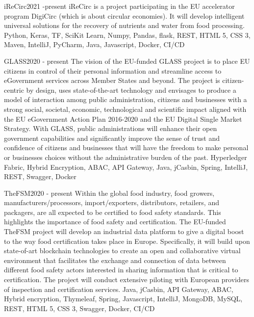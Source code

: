 \begin{projects}
	\project
	{iReCirc}{2021  -present}
	{}
	{iReCirc is a project participating in the EU accelerator program DigiCirc (which is about circular economies). It will develop intelligent universal solutions for the recovery of nutrients and water from food processing.}
	{Python, Keras, TF, SciKit Learn, Numpy, Pandas, flask, REST, HTML 5, CSS 3, Maven, IntelliJ, PyCharm, Java, Javascript, Docker, CI/CD}

	\project
	{GLASS}{2020 - present}
	{}
	{The vision of the EU-funded GLASS project is to place EU citizens in control of their personal information and streamline access to eGovernment services across Member States and beyond. The project is citizen-centric by design, uses state-of-the-art technology and envisages to produce a model of interaction among public administration, citizens and businesses with a strong social, societal, economic, technological and scientific impact aligned with the EU eGovernment Action Plan 2016-2020 and the EU Digital Single Market Strategy. With GLASS, public administrations will enhance their open government capabilities and significantly improve the sense of trust and confidence of citizens and businesses that will have the freedom to make personal or businesses choices without the administrative burden of the past.}
	{Hyperledger Fabric, Hybrid Encryption, ABAC, API Gateway, Java, jCasbin, Spring, IntelliJ, REST, Swagger, Docker}

	\project
	{TheFSM}{2020 - present}
	{}
	{Within the global food industry, food growers, manufacturers/processors, import/exporters, distributors, retailers, and packagers, are all expected to be certified to food safety standards. This highlights the importance of food safety and certification. The EU-funded TheFSM project will develop an industrial data platform to give a digital boost to the way food certification takes place in Europe. Specifically, it will build upon state-of-art blockchain technologies to create an open and collaborative virtual environment that facilitates the exchange and connection of data between different food safety actors interested in sharing information that is critical to certification. The project will conduct extensive piloting with European providers of inspection and certification services.}
	{Java, jCasbin, API Gateway, ABAC, Hybrid encryption, Thymeleaf, Spring, Javascript, IntelliJ, MongoDB, MySQL, REST, HTML 5, CSS 3, Swagger, Docker, CI/CD}


\end{projects}
